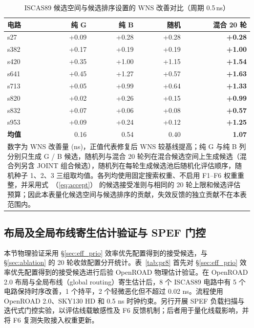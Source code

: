 \documentclass[twocolumn,10pt,fontset=windows]{ctexart}
\renewcommand{\eqref}[1]{\textup{（\ref{#1}）}}
\begin{document}
\begin{table}[H]
\centering
\caption{ISCAS89 候选空间与候选排序设置的 WNS 改善对比（周期 0.5\,ns）}
\label{tab:ablation}
\scriptsize
\setlength{\tabcolsep}{3pt}
\begin{tabular}{lrrrr}
\toprule
\textbf{电路} & \textbf{纯 G} & \textbf{纯 B} & \textbf{随机} & \textbf{混合 20 轮} \\
\midrule
s27  & +0.09 & +0.28 & +0.28 & \textbf{+0.28} \\
s382 & +0.17 & +0.19 & +0.19 & \textbf{+1.00} \\
s420 & +0.35 & +1.00 & +1.15 & \textbf{+1.54} \\
s641 & +0.45 & +1.27 & +0.57 & \textbf{+1.63} \\
s713 & +0.05 & +0.99 & +0.64 & \textbf{+1.33} \\
s820 & +0.02 & +0.26 & +0.15 & \textbf{+0.99} \\
s832 & +0.07 & +0.06 & +0.08 & \textbf{+0.57} \\
s953 & +0.09 & +0.24 & +0.12 & \textbf{+1.25} \\
\midrule
\textbf{均值} & 0.16 & 0.54 & 0.40 & \textbf{1.07} \\
\bottomrule
\multicolumn{5}{p{0.92\columnwidth}}{\footnotesize 数字为 WNS 改善量 (ns)，正值代表修复后 WNS 较基线提高；纯 G 与纯 B 列分别只生成 G / B 候选，随机列与混合 20 轮列在混合候选空间上生成候选（混合列另含 JOINT 组合候选），随机列在每轮生成候选池后随机化评估顺序，随机种子 1、2、3 三组取均值。各列均使用固定搜索权重、不启用 F1--F6 权重重整，并采用式~\eqref{eq:accept} 的候选接受准则与相同的 20 轮上限和候选评估预算；因此本表量化候选空间与候选排序的贡献，失效反馈的独立贡献不在本表范围内。} \\
\end{tabular}
\end{table}

\subsection{布局及全局布线寄生估计验证与 SPEF 门控}\label{sec:phys_closure}
\FloatBarrier

本节物理验证采用 \S\ref{sec:eff_prio} 效率优先配置得到的接受候选，与 \S\ref{sec:ablation} 的 20 轮收敛配置分开统计。表~\ref{tab:pr8} 首先对 \S\ref{sec:eff_prio} 效率优先配置得到的接受候选进行后验 OpenROAD 物理估计验证。在 OpenROAD 2.0 布局与全局布线（global routing）寄生估计后，8 个 ISCAS89 电路中有 5 个电路保持时序改善，1 个持平，2 个轻微恶化但不超过 0.02 ns。流程使用 OpenROAD 2.0、SKY130 HD 和 0.5 ns 时钟约束。另行开展 SPEF 负载扫描与迭代式门控实验，以评估线载敏感性及 F6 反馈机制；后者用于量化线载影响，并将 F6 复测失败接入权重更新。
\end{document}
